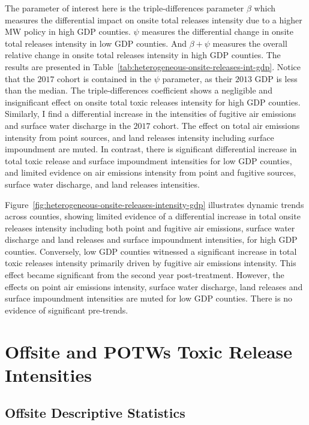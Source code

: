 \documentclass[numsec,webpdf,contemporary,large,namedate]{oup-authoring-template}%
\begin{document}
    The parameter of interest here is the triple-differences parameter $\beta$ which measures the differential impact on onsite total releases intensity due to a higher MW policy in high GDP counties. $\psi$ measures the differential change in onsite total releases intensity in low GDP counties. And $\beta + \psi$ measures the overall relative change in onsite total releases intensity in high GDP counties. The results are presented in Table~\ref{tab:heterogeneous-onsite-releases-int-gdp}. Notice that the $2017$ cohort is contained in the $\psi$ parameter, as their $2013$ GDP is less than the median. The triple-differences coefficient shows a negligible and insignificant effect on onsite total toxic releases intensity for high GDP counties. Similarly, I find a differential increase in the intensities of fugitive air emissions and surface water discharge in the $2017$ cohort. The effect on total air emissions intensity from point sources, and land releases intensity including surface impoundment are muted. In contrast, there is significant differential increase in total toxic release and surface impoundment intensities for low GDP counties, and limited evidence on air emissions intensity from point and fugitive sources, surface water discharge, and land releases intensities.
    
    

    Figure~\ref{fig:heterogeneous-onsite-releases-intensity-gdp} illustrates dynamic trends across counties, showing limited evidence of a differential increase in total onsite releases intensity including both point and fugitive air emissions, surface water discharge and land releases and surface impoundment intensities, for high GDP counties. Conversely, low GDP counties witnessed a significant increase in total toxic releases intensity primarily driven by fugitive air emissions intensity. This effect became significant from the second year post-treatment. However, the effects on point air emissions intensity, surface water discharge, land releases and surface impoundment intensities are muted for low GDP counties. There is no evidence of significant pre-trends.


    \section{Offsite and POTWs Toxic Release Intensities}\label{sec:offsite-and-potws-toxic-release-intensities}

    \subsection{Offsite Descriptive Statistics}\label{subsec:offsite-descriptive-statistics}
    
    
\end{document}
